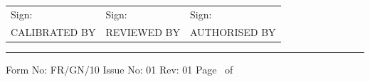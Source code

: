 \documentclass[a4paper,10pt]{article}
\begin{document}
\vspace{12mm}


\begin{tabularx}{\textwidth}{XXX}

\centering Sign:
&
\centering Sign:
&
\centering Sign:
\\[12mm]

\centering CALIBRATED BY
&
\centering REVIEWED BY
&
\centering AUTHORISED BY

\end{tabularx}

\vfill

\hrule

\vspace{2mm}

\footnotesize

Form No: FR/GN/10
\hfill
Issue No: 01
\hfill
Rev: 01
\hfill
Page \thepage\ of \pageref{LastPage}
\end{document}
